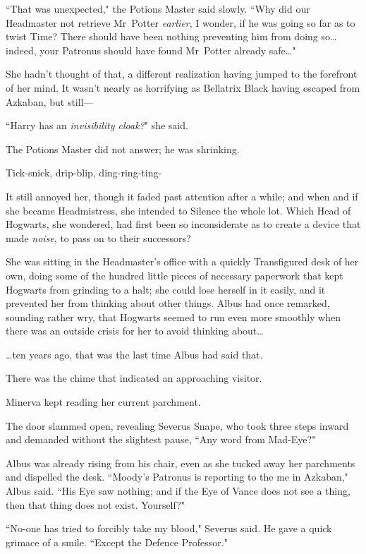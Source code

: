 ``That was unexpected," the Potions Master said slowly. ``Why did our Headmaster not retrieve Mr~Potter \emph{earlier}, I wonder, if he was going so far as to twist Time? There should have been nothing preventing him from doing so…indeed, your Patronus should have found Mr~Potter already safe…"

She hadn't thought of that, a different realization having jumped to the forefront of her mind. It wasn't nearly as horrifying as Bellatrix Black having escaped from Azkaban, but still—

``Harry has an \emph{invisibility cloak?}" she said.

The Potions Master did not answer; he was shrinking.

\later

Tick-snick, drip-blip, ding-ring-ting-

It still annoyed her, though it faded past attention after a while; and when and if she became Headmistress, she intended to Silence the whole lot. Which Head of Hogwarts, she wondered, had first been so inconsiderate as to create a device that made \emph{noise}, to pass on to their successors?

She was sitting in the Headmaster's office with a quickly Transfigured desk of her own, doing some of the hundred little pieces of necessary paperwork that kept Hogwarts from grinding to a halt; she could lose herself in it easily, and it prevented her from thinking about other things. Albus had once remarked, sounding rather wry, that Hogwarts seemed to run even more smoothly when there was an outside crisis for her to avoid thinking about…

…ten years ago, that was the last time Albus had said that.

There was the chime that indicated an approaching visitor.

Minerva kept reading her current parchment.

The door slammed open, revealing Severus Snape, who took three steps inward and demanded without the slightest pause, ``Any word from Mad-Eye?"

Albus was already rising from his chair, even as she tucked away her parchments and dispelled the desk. ``Moody's Patronus is reporting to the me in Azkaban," Albus said. ``His Eye saw nothing; and if the Eye of Vance does not see a thing, then that thing does not exist. Yourself?"

``No-one has tried to forcibly take my blood," Severus said. He gave a quick grimace of a smile. ``Except the Defence Professor."

